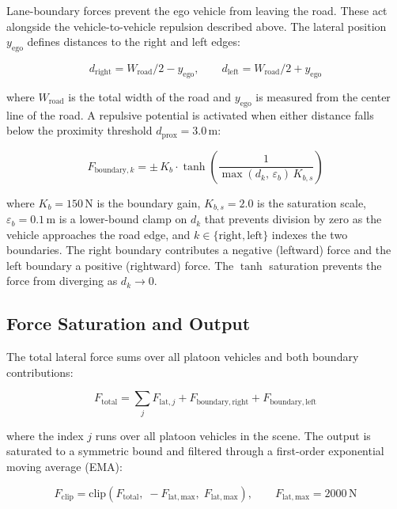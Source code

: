 \documentclass[12pt,a4paper,oneside]{report}
\begin{document}
Lane-boundary forces prevent the ego vehicle from leaving the road. These act alongside the vehicle-to-vehicle repulsion described above. The lateral position $y_{\mathrm{ego}}$ defines distances to the right and left edges:

\begin{equation}
d_{\mathrm{right}} = W_{\mathrm{road}}/2 - y_{\mathrm{ego}}, \qquad d_{\mathrm{left}} = W_{\mathrm{road}}/2 + y_{\mathrm{ego}}
\label{eq:lat_boundary_dists}
\end{equation}

where $W_{\mathrm{road}}$ is the total width of the road and $y_{\mathrm{ego}}$ is measured from the center line of the road. A repulsive potential is activated when either distance falls below the proximity threshold $d_{\mathrm{prox}} = 3.0\,\mathrm{m}$:

\begin{equation}
F_{\mathrm{boundary},k} = \pm\, K_b \cdot \tanh\!\left(\frac{1}{\max(d_k,\,\varepsilon_b)\,K_{b,s}}\right)
\label{eq:lat_boundary_force}
\end{equation}

where $K_b = 150\,\mathrm{N}$ is the boundary gain, $K_{b,s} = 2.0$ is the saturation scale, $\varepsilon_b = 0.1\,\mathrm{m}$ is a lower-bound clamp on $d_k$ that prevents division by zero as the vehicle approaches the road edge, and $k \in \{\mathrm{right}, \mathrm{left}\}$ indexes the two boundaries. The right boundary contributes a negative (leftward) force and the left boundary a positive (rightward) force. The $\tanh$ saturation prevents the force from diverging as $d_k \to 0$.

\subsection{Force Saturation and Output}
\label{sec:lat_output}

The total lateral force sums over all platoon vehicles and both boundary contributions:

\begin{equation}
F_{\mathrm{total}} = \sum_{j} F_{\mathrm{lat},j} + F_{\mathrm{boundary,right}} + F_{\mathrm{boundary,left}}
\label{eq:lat_total}
\end{equation}

where the index $j$ runs over all platoon vehicles in the scene. The output is saturated to a symmetric bound and filtered through a first-order exponential moving average (EMA):

\begin{equation}
F_{\mathrm{clip}} = \mathrm{clip}\!\left(F_{\mathrm{total}},\; -F_{\mathrm{lat,max}},\; F_{\mathrm{lat,max}}\right), \qquad F_{\mathrm{lat,max}} = 2000\,\mathrm{N}
\label{eq:lat_saturation}
\end{equation}
\end{document}
